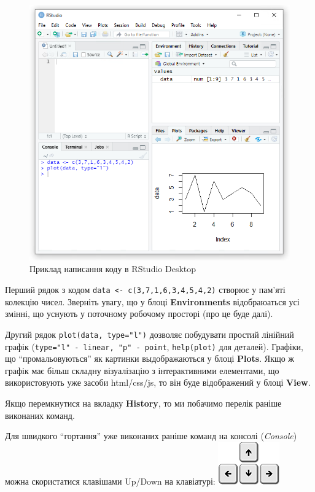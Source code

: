\documentclass[
]{book}
\begin{document}
\begin{figure}
\includegraphics[width=9.4in]{images/chapter1/rstudio_4} \caption{Приклад написання коду в RStudio Desktop}\label{fig:unnamed-chunk-16}
\end{figure}

Перший рядок з кодом \texttt{data\ \textless{}-\ c(3,7,1,6,3,4,5,4,2)} створює у пам'яті колекцію чисел. Зверніть увагу, що у блоці \textbf{Environments} відобраюаться усі змінні, що уснують у поточному робочому просторі (про це буде далі).

Другий рядок \texttt{plot(data,\ type="l")} дозволяє побудувати простий лінійний графік (\texttt{type="l"\ -\ linear,\ "p"\ -\ point}, \texttt{help(plot)} для деталей). Графіки, що ``промальовуються'' як картинки выдображаються у блоці \textbf{Plots}. Якщо ж графік має більш складну візуалізацію з інтерактивними елементами, що використовують уже засоби html/css/js, то він буде відображений у блоці \textbf{View}.

Якщо перемкнутися на вкладку \textbf{History}, то ми побачимо перелік раніше виконаних команд.

Для швидкого ``гортання'' уже виконаних раніше команд на консолі (\emph{Console}) можна скористатися клавішами Up/Down на клавіатурі:
\includegraphics{images/chapter1/arrow_keys.png}
\end{document}
